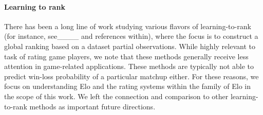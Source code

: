\paragraph{Learning to rank}
There has been a long line of work studying various flavors of learning-to-rank (for instance, see____ and references within), where the focus is to construct a global ranking based on a dataset partial observations. 
While highly relevant to task of rating game players, we note that these methods generally receive less attention in game-related applications. These methods are typically not able to predict win-loss probability of a particular matchup either.
For these reasons, we focus on understanding Elo and the rating systems within the family of Elo in the scope of this work. We left the connection and comparison to other learning-to-rank methods as important future directions.
